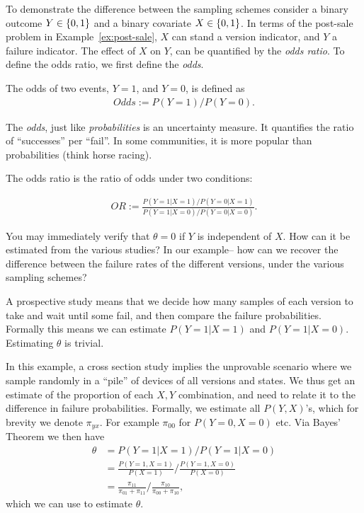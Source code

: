To demonstrate the difference between the sampling schemes consider a binary outcome $Y\in\{ 0,1 \}$ and a binary covariate $X\in\{ 0,1 \}$. 
In terms of the post-sale problem in Example~\ref{ex:post-sale}, $X$ can stand a version indicator, and $Y$ a failure indicator. 
The effect of $X$ on $Y$, can be quantified by the \emph{odds ratio}. 
To define the odds ratio, we first define the \emph{odds}.

\begin{definition}[Odds]
	The odds of two events, $Y=1$, and $Y=0$, is defined as 
	\begin{align}
	Odds:= P(Y=1)/P(Y=0).
	\end{align}
\end{definition}
The \emph{odds}, just like \emph{probabilities} is an uncertainty measure. 
It quantifies the ratio of ``successes'' per ``fail''. 
In some communities, it is more popular than probabilities (think horse racing). 

The odds ratio is the ratio of odds under two conditions: 
\begin{definition}
	\begin{align}
	OR := \frac{P(Y=1|X=1) / P(Y=0|X=1)}{P(Y=1|X=0) / P(Y=0|X=0)}.
	\end{align}
\end{definition}
You may immediately verify that $\theta=0$ if $Y$ is independent of $X$. 
How can it be estimated from the various studies?
In our example-- how can we recover the difference between the failure rates of the different versions, under the various sampling schemes?

A prospective study means that we decide how many samples of each version to take and wait until some fail, and then compare the failure probabilities. 
Formally this means we can estimate $P(Y=1|X=1)$ and $P(Y=1|X=0)$.
Estimating $\theta$ is trivial. 

In this example, a cross section study implies the unprovable scenario where we sample randomly in a ``pile'' of devices of all versions and states. 
We thus get an estimate of the proportion of each $X,Y$ combination, and need to relate it to the difference in failure probabilities. 
Formally, we estimate all $P(Y,X)$'s, which for brevity we denote $\pi_{yx}$.
For example $\pi_{00}$ for $P(Y=0,X=0)$ etc. 
Via Bayes' Theorem we then have 
\begin{align*}
	\theta 
	&= P(Y=1|X=1) / P(Y=1|X=0) \\
	&= \frac{P(Y=1,X=1)}{P(X=1)} / \frac{P(Y=1,X=0)}{P(X=0)} \\
	&= \frac{\pi_{11}}{\pi_{01}+\pi_{11}} / \frac{\pi_{10}}{\pi_{00}+\pi_{10}},
\end{align*}
which we can use to estimate $\theta$. 

